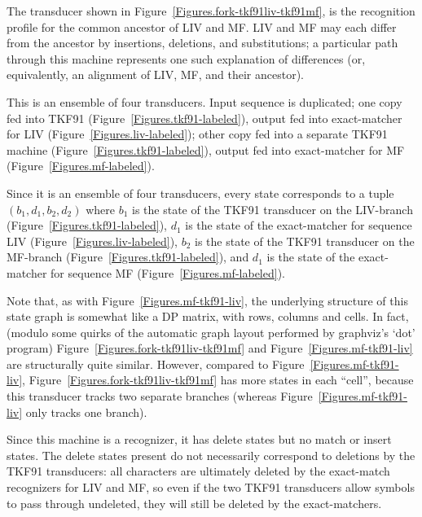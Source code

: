 \documentclass{article}
\newcommand{\figref}[1]{Figure~\ref{Figures.#1}}
\begin{document}
The transducer shown in \figref{fork-tkf91liv-tkf91mf}, is the recognition profile for the common ancestor of LIV and MF.
LIV and MF may each differ from the ancestor by insertions, deletions, and substitutions;
 a particular path through this machine represents one such explanation of differences
 (or, equivalently, an alignment of LIV, MF, and their ancestor).  

This is an ensemble of four transducers.
Input sequence is duplicated;
one copy fed into TKF91 (\figref{tkf91-labeled}),
output fed into exact-matcher for LIV (\figref{liv-labeled});
other copy fed into a separate TKF91 machine (\figref{tkf91-labeled}),
output fed into exact-matcher for MF (\figref{mf-labeled}).

Since it is an ensemble of four transducers, every state corresponds to a tuple $(b_1,d_1,b_2,d_2)$
where
$b_1$ is the state of the TKF91 transducer on the LIV-branch (\figref{tkf91-labeled}),
$d_1$ is the state of the exact-matcher for sequence LIV (\figref{liv-labeled}),
$b_2$ is the state of the TKF91 transducer on the MF-branch (\figref{tkf91-labeled}),
and $d_1$ is the state of the exact-matcher for sequence MF (\figref{mf-labeled}).

Note that, as with \figref{mf-tkf91-liv},
the underlying structure of this state graph is somewhat like a DP matrix,
with rows, columns and cells.
In fact, 
(modulo some quirks of the automatic graph layout performed by graphviz's `dot' program)
\figref{fork-tkf91liv-tkf91mf} and \figref{mf-tkf91-liv} are structurally quite similar.
However, compared to \figref{mf-tkf91-liv},
\figref{fork-tkf91liv-tkf91mf} has more states in each ``cell'',
because this transducer tracks two separate branches
(whereas \figref{mf-tkf91-liv} only tracks one branch).

Since this machine is a recognizer, it has delete states but no match or insert states.
The delete states present do not necessarily correspond to  deletions by the TKF91 transducers:
all characters are ultimately deleted by the exact-match recognizers for LIV and MF,
so even if the two TKF91 transducers allow symbols to pass through undeleted,
they will still be deleted by the exact-matchers.
\end{document}
